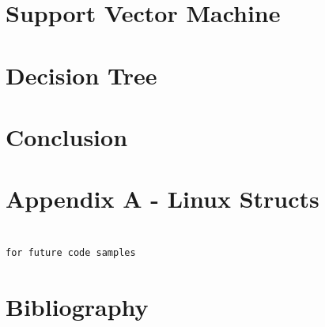 \documentclass[10pt,letterpaper,onecolumn,draftclsnofoot]{IEEEtran}
\begin{document}
\section{Support Vector Machine}
\section{Decision Tree}

\section{Conclusion}

\clearpage
\section{Appendix A - Linux Structs}

\begin{lstlisting}

for future code samples

\end{lstlisting}

\section{Bibliography}


\end{document}
